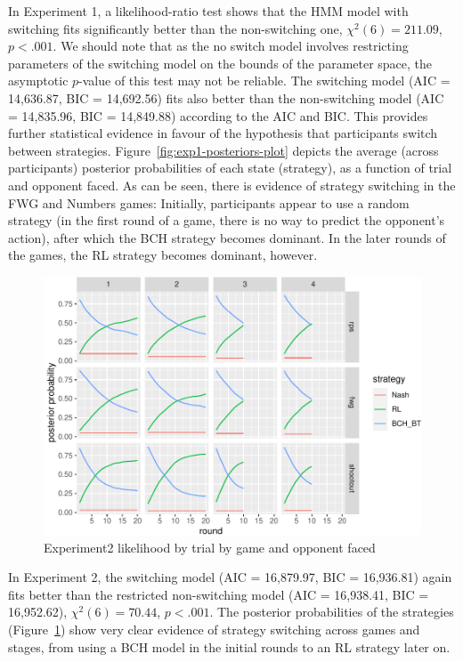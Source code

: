 \documentclass[
  english,
  man,floatsintext]{apa6}
\begin{document}
In Experiment 1, a likelihood-ratio test shows that the HMM model with switching fits significantly better than the non-switching one, \(\chi^2(6) = 211.09\), \(p < .001\). We should note that as the no switch model involves restricting parameters of the switching model on the bounds of the parameter space, the asymptotic \(p\)-value of this test may not be reliable. The switching model (AIC = 14,636.87, BIC = 14,692.56) fits also better than the non-switching model (AIC = 14,835.96, BIC = 14,849.88) according to the AIC and BIC. This provides further statistical evidence in favour of the hypothesis that participants switch between strategies. Figure~\ref{fig:exp1-posteriors-plot} depicts the average (across participants) posterior probabilities of each state (strategy), as a function of trial and opponent faced. As can be seen, there is evidence of strategy switching in the FWG and Numbers games: Initially, participants appear to use a random strategy (in the first round of a game, there is no way to predict the opponent's action), after which the BCH strategy becomes dominant. In the later rounds of the games, the RL strategy becomes dominant, however.

\begin{figure}

{\centering \includegraphics{paper_draft_2021_files/figure-latex/exp2-posteriors-plot-1} 

}

\caption{Experiment2 likelihood by trial by game and opponent faced}\label{fig:exp2-posteriors-plot}
\end{figure}

In Experiment 2, the switching model (AIC = 16,879.97, BIC = 16,936.81) again fits better than the restricted non-switching model (AIC = 16,938.41, BIC = 16,952.62), \(\chi^2(6) = 70.44\), \(p < .001\). The posterior probabilities of the strategies (Figure~\ref{fig:exp2-posteriors-plot}) show very clear evidence of strategy switching across games and stages, from using a BCH model in the initial rounds to an RL strategy later on.
\end{document}
